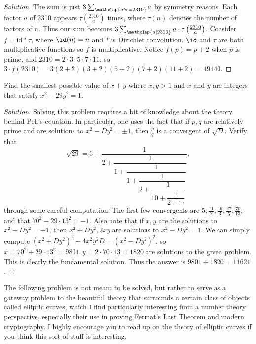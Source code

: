 \ifsolutions
\begin{proof}[Solution]
The sum is just $3 \sum_{\mathclap{abc = 2310}} a$ by symmetry reasons. Each
factor $a$ of 2310 appears $\tau \left(\frac{2310}{a}\right)$ times, where
$\tau(n)$ denotes the number of factors of $n$. Thus our sum becomes $3
\sum_{\mathclap{a \mid 2310}} a \cdot \tau \left(\frac{2310}{a}\right)$.
Consider $f = \mathrm{id} * \tau$, where $\id(n) = n$ and $*$ is Dirichlet
convolution. $\id$ and $\tau$ are both multiplicative functions so $f$ is
multiplicative. Notice $f(p) = p + 2$ when $p$ is prime, and $2310 = 2 \cdot 3
\cdot 5 \cdot 7 \cdot 11$, so $3 \cdot f(2310) = 3(2 + 2)(3 + 2)(5 + 2)(7 +
2)(11 + 2) = \boxed{49140}$.
\end{proof}
\fi

\begin{prb}
Find the smallest possible value of $x + y$ where $x, y > 1$ and $x$ and $y$ are
integers that satisfy $x^2 - 29y^2 = 1$.
\end{prb}

\ifsolutions
\begin{proof}[Solution]
Solving this problem requires a bit of knowledge about the theory behind Pell's
equation. In particular, one uses the fact that if $p, q$ are relatively prime
and are solutions to $x^2 - Dy^2 = \pm 1$, then $\frac{p}{q}$ is a convergent of
$\sqrt{D}$. Verify that
\[ \sqrt{29} = 5 + \dfrac{1}{2 + \dfrac{1}{1 + \dfrac{1}{1 + \dfrac{1}{2 +
\dfrac{1}{10 + \dfrac{1}{2 + \cdots}}}}}}, \]
through some careful computation. The first few convergents are $5,
\frac{11}{2}, \frac{16}{3}, \frac{27}{5}, \frac{70}{13}$, and that $70^2 - 29
\cdot 13^2 = -1$. Also note that if $x, y$ are the solutions to $x^2 - Dy^2 =
-1$, then $x^2 + Dy^2, 2xy$ are solutions to $x^2 - Dy^2 = 1$. We can simply
compute $(x^2 + Dy^2)^2 - 4x^2 y^2 D = (x^2 - Dy^2)^2$, so $x = 70^2 + 29 \cdot
13^2 = 9801, y = 2 \cdot 70 \cdot 13 = 1820$ are solutions to the given problem.
This is clearly the fundamental solution. Thus the answer is $9801 + 1820 =
\boxed{11621}$.
\end{proof}
\fi

The following problem is not meant to be solved, but rather to serve as a
gateway problem to the beautiful theory that surrounds a certain class of
objects called elliptic curves, which I find particularly interesting from a
number theory perspective, especially their use in proving Fermat's Last Theorem
and modern cryptography. I highly encourage you to read up on the theory of
elliptic curves if you think this sort of stuff is interesting.

